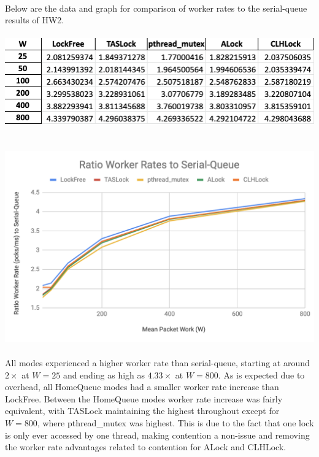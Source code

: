 \documentclass{article}
\begin{document}
\begin{adjustwidth}{-2cm}{-2cm}
\null\\Below are the data and graph for comparison of worker rates to the serial-queue results of HW2.\\
\null\\
\includegraphics[width=\linewidth]{b_overhead2sqData.png}\\ \null\\
\null\\
\includegraphics[width=\linewidth]{b_overhead2sqGraph.png}\\ \null\\
All modes experienced a higher worker rate than serial-queue, starting at around $2\times$ at $W=25$ and ending as high as $4.33\times$ at $W=800$. As is expected due to overhead, all HomeQueue modes had a smaller worker rate increase than LockFree. Between the HomeQueue modes worker rate increase was fairly equivalent, with TASLock maintaining the highest throughout except for $W=800$, where pthread\_mutex was highest. This is due to the fact that one lock is only ever accessed by one thread, making contention a non-issue and removing the worker rate advantages related to contention for ALock and CLHLock.


\end{adjustwidth}
\end{document}

